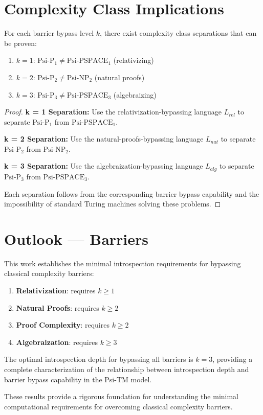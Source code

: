 \section{Complexity Class Implications}

\begin{theorem}
For each barrier bypass level $k$, there exist complexity class separations that can be proven:
\begin{enumerate}
\item $k = 1$: $\text{Psi-P}_1 \neq \text{Psi-PSPACE}_1$ (relativizing)
\item $k = 2$: $\text{Psi-P}_2 \neq \text{Psi-NP}_2$ (natural proofs)
\item $k = 3$: $\text{Psi-P}_3 \neq \text{Psi-PSPACE}_3$ (algebraizing)
\end{enumerate}
\end{theorem}

\begin{proof}
\textbf{k = 1 Separation:}
Use the relativization-bypassing language $L_{rel}$ to separate $\text{Psi-P}_1$ from $\text{Psi-PSPACE}_1$.

\textbf{k = 2 Separation:}
Use the natural-proofs-bypassing language $L_{nat}$ to separate $\text{Psi-P}_2$ from $\text{Psi-NP}_2$.

\textbf{k = 3 Separation:}
Use the algebraization-bypassing language $L_{alg}$ to separate $\text{Psi-P}_3$ from $\text{Psi-PSPACE}_3$.

Each separation follows from the corresponding barrier bypass capability and the impossibility of standard Turing machines solving these problems.
\end{proof}

\section{Outlook — Barriers}

This work establishes the minimal introspection requirements for bypassing classical complexity barriers:

\begin{enumerate}
\item \textbf{Relativization}: requires $k \geq 1$
\item \textbf{Natural Proofs}: requires $k \geq 2$
\item \textbf{Proof Complexity}: requires $k \geq 2$
\item \textbf{Algebraization}: requires $k \geq 3$
\end{enumerate}

The optimal introspection depth for bypassing all barriers is $k = 3$, providing a complete characterization of the relationship between introspection depth and barrier bypass capability in the Psi-TM model.

These results provide a rigorous foundation for understanding the minimal computational requirements for overcoming classical complexity barriers.


